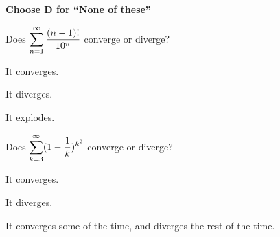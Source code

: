 \documentclass[12pt]{exam}
\newcommand{\ds}{\ensuremath{\displaystyle}}
\newcommand{\<}{\langle}
\renewcommand{\>}{\rangle}
\begin{document}
\begin{center}
\end{center}
\vspace{0.1in}

\vspace{12pt}

\textbf{Choose D for ``None of these''}

\begin{questions}\setcounter{question}{38}

\question
Does \(\ds\sum_{n=1}^\infty\frac{(n-1)!}{10^n}\) converge or
diverge?
\begin{choices}
\item It converges.
\item It diverges.
\item It explodes.
\end{choices}

\question
Does \(\ds\sum_{k=3}^\infty(1-\frac{1}{k})^{k^2}\) converge or
diverge?
\begin{choices}
\item It converges.
\item It diverges.
\item It converges some of the time, and diverges the rest of the time.
\end{choices}

\end{questions}
\end{document}
